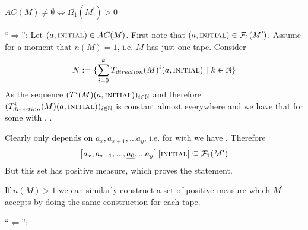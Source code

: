 \begin{Lemma}
	$AC(M) \neq \emptyset \Leftrightarrow \Omega_1(M^\prime) > 0$
\end{Lemma}
\proof
	``$\Rightarrow$'':
	Let $(a,\text{\scshape{initial}}) \in AC(M)$.
	First note that $(a,\text{\scshape{initial}}) \in \mathcal{F}_1(M^\prime)$.
	Assume for a moment that $n(M) = 1$, i.e. $M$ has just one tape. Consider
	\begin{align*}
		N := \{ \sum_{i=0}^k T_{direction}(M)^i(a,\text{\scshape{initial}})~|~k \in \mathbb{N} \}
	\end{align*}
	As the sequence $(T^i(M)(a,\text{\scshape{initial}}))_{i \in \mathbb{N}}$ and therefore $(T_{direction}^i(M)(a,\text{\scshape{initial}}))_{i \in \mathbb{N}}$ is constant almost everywhere
	and 
	we have that  for some  with , .
	
	Clearly  only depends on $a_x, a_{x+1},...a_y$, i.e. for  with  we have . Therefore
	\begin{align*}
		\left [ a_x, a_{x+1},...,\underline{a_0},...a_y \right ][\text{\scshape{initial}}] \subseteq \mathcal{F}_1(M^\prime)
	\end{align*}
	But this set has positive measure, which proves the statement.

	If $n(M) > 1$ we can similarly construct a set of positive measure which $M^\prime$ accepts by doing the same construction for each tape.

	``$\Leftarrow$'':
\endproof
